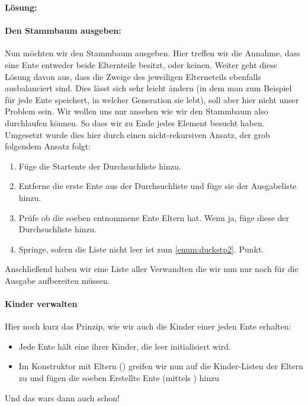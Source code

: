 \documentclass[table]{sopra-base}
\makeatletter
\newenvironment{solution}{\null\par\noindent\textbf{\textcolor{sob@col@uulm@cs}{Lösung:}}\newline\bgroup\color{black}\slshape\ignorespaces}{\egroup}
\makeatother
\begin{document}
\begin{solution}
        \paragraph{Den Stammbaum ausgeben:}
        Nun möchten wir den Stammbaum ausgeben. Hier treffen wir die Annahme, dass eine Ente entweder beide Elternteile besitzt, oder keinen. Weiter geht diese Lösung davon aus, dass die Zweige des jeweiligen Elterneteils ebenfalls ausbalanciert sind. Dies lässt sich sehr leicht ändern (in dem man zum Beispiel für jede Ente speichert, in welcher Generation sie lebt), soll aber hier nicht unser Problem sein. Wir wollen uns nur ansehen wie wir den Stammbaum  also durchlaufen können. So dass wir zu Ende jedes Element besucht haben. Umgesetzt wurde dies hier durch einen nicht-rekursiven Ansatz, der grob folgendem Ansatz folgt:
        \begin{enumerate}[nolistsep]
            \item Füge die Startente der Durchsuchliste hinzu.
            \item \label{enum:duckstp2}Entferne die erste Ente aus der Durchsuchliste und füge sie der Ausgabeliste hinzu.
            \item Prüfe ob die soeben entnommene Ente Eltern hat. Wenn ja, füge diese der Durchsuchliste hinzu.
            \item Springe, sofern die Liste nicht leer ist zum \ref{enum:duckstp2}. Punkt.
        \end{enumerate}
        Anschließend haben wir eine Liste aller Verwandten die wir nun nur noch für die Ausgabe aufbereiten müssen. 
        \paragraph{Kinder verwalten}
        Hier noch kurz das Prinzip, wie wir auch die Kinder einer jeden Ente erhalten:
        \begin{itemize}[nolistsep]
            \item Jede Ente hält eine  ihrer Kinder, die leer initialisiert wird.
            \item Im Konstruktor mit Eltern () greifen wir nun auf die Kinder-Listen der Eltern zu und fügen die soeben Erstellte Ente (mittels ) hinzu
        \end{itemize}
        Und das wars dann auch schon!
    \egroup
\end{solution}
\end{document}
